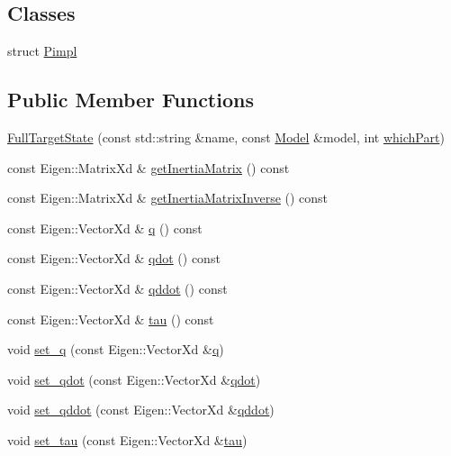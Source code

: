 \subsection*{Classes}
\begin{DoxyCompactItemize}
\item 
struct \hyperlink{structocra_1_1FullTargetState_1_1Pimpl}{Pimpl}
\end{DoxyCompactItemize}
\subsection*{Public Member Functions}
\begin{DoxyCompactItemize}
\item 
\hyperlink{classocra_1_1FullTargetState_a8164de6021f986fb82022b2fed1e0402}{Full\+Target\+State} (const std\+::string \&name, const \hyperlink{classocra_1_1Model}{Model} \&model, int \hyperlink{classocra_1_1FullState_a75ec7c039df8cb8608ebf34f7b779be5}{which\+Part})
\item 
const Eigen\+::\+Matrix\+Xd \& \hyperlink{classocra_1_1FullTargetState_ad7a1b06462ba3cc348e5634e1a0db0b2}{get\+Inertia\+Matrix} () const
\item 
const Eigen\+::\+Matrix\+Xd \& \hyperlink{classocra_1_1FullTargetState_a55194b2f5683696eeee538cb93f3403a}{get\+Inertia\+Matrix\+Inverse} () const
\item 
const Eigen\+::\+Vector\+Xd \& \hyperlink{classocra_1_1FullTargetState_a0f246232828d53c497924b95d2b97004}{q} () const
\item 
const Eigen\+::\+Vector\+Xd \& \hyperlink{classocra_1_1FullTargetState_a2ada581270803a39e8c690f8c9354644}{qdot} () const
\item 
const Eigen\+::\+Vector\+Xd \& \hyperlink{classocra_1_1FullTargetState_a1436b42b01d2857e4dc5c53a233f0e69}{qddot} () const
\item 
const Eigen\+::\+Vector\+Xd \& \hyperlink{classocra_1_1FullTargetState_a56855f5d42e84f456a89fd259c4b7edb}{tau} () const
\item 
void \hyperlink{classocra_1_1FullTargetState_a902f4f9662d53b930073cab837ab7835}{set\+\_\+q} (const Eigen\+::\+Vector\+Xd \&\hyperlink{classocra_1_1FullTargetState_a0f246232828d53c497924b95d2b97004}{q})
\item 
void \hyperlink{classocra_1_1FullTargetState_afdaa12a27a353e3aca61212fa1313c5b}{set\+\_\+qdot} (const Eigen\+::\+Vector\+Xd \&\hyperlink{classocra_1_1FullTargetState_a2ada581270803a39e8c690f8c9354644}{qdot})
\item 
void \hyperlink{classocra_1_1FullTargetState_a462f462af7480759f251cc2087c747e7}{set\+\_\+qddot} (const Eigen\+::\+Vector\+Xd \&\hyperlink{classocra_1_1FullTargetState_a1436b42b01d2857e4dc5c53a233f0e69}{qddot})
\item 
void \hyperlink{classocra_1_1FullTargetState_a351cd0cf06d81362558128b0d8d4149a}{set\+\_\+tau} (const Eigen\+::\+Vector\+Xd \&\hyperlink{classocra_1_1FullTargetState_a56855f5d42e84f456a89fd259c4b7edb}{tau})
\end{DoxyCompactItemize}
